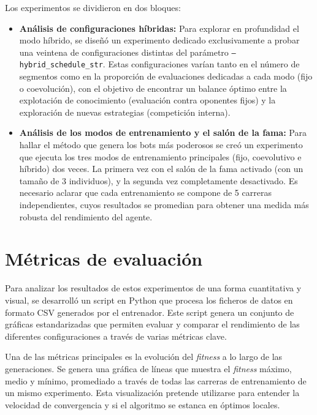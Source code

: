 Los experimentos se dividieron en dos bloques:
\begin{itemize}
	\item \textbf{Análisis de configuraciones híbridas:} Para explorar en profundidad el modo híbrido, se diseñó un experimento dedicado exclusivamente a probar una veintena de configuraciones distintas del parámetro \texttt{--hybrid\_schedule\_str}. Estas configuraciones varían tanto en el número de segmentos como en la proporción de evaluaciones dedicadas a cada modo (fijo o coevolución), con el objetivo de encontrar un balance óptimo entre la explotación de conocimiento (evaluación contra oponentes fijos) y la exploración de nuevas estrategias (competición interna).
	\item \textbf{Análisis de los modos de entrenamiento y el salón de la fama:} Para hallar el método que genera los bots más poderosos se creó un experimento que ejecuta los tres modos de entrenamiento principales (fijo, coevolutivo e híbrido) dos veces. La primera vez con el salón de la fama activado (con un tamaño de 3 individuos), y la segunda vez completamente desactivado. Es necesario aclarar que cada entrenamiento se compone de 5 carreras independientes, cuyos resultados se promedian para obtener una medida más robusta del rendimiento del agente.
\end{itemize}

\section{Métricas de evaluación} \label{sec:metricas_evaluacion}

Para analizar los resultados de estos experimentos de una forma cuantitativa y visual, se desarrolló un script en Python que procesa los ficheros de datos en formato CSV generados por el entrenador. Este script genera un conjunto de gráficas estandarizadas que permiten evaluar y comparar el rendimiento de las diferentes configuraciones a través de varias métricas clave.

Una de las métricas principales es la evolución del \textit{fitness} a lo largo de las generaciones. Se genera una gráfica de líneas que muestra el \textit{fitness} máximo, medio y mínimo, promediado a través de todas las carreras de entrenamiento de un mismo experimento. Esta visualización pretende utilizarse para entender la velocidad de convergencia y si el algoritmo se estanca en óptimos locales.

